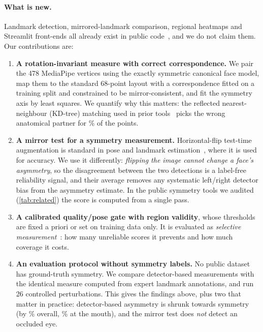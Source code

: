 \paragraph{What is new.}
Landmark detection, mirrored-landmark comparison, regional heatmaps and Streamlit
front-ends all already exist in public code~\cite{nashokan_facialasymmetry,
varghaei2025aesthetic,irimid}, and we do not claim them. Our contributions are:
\begin{enumerate}[leftmargin=*,itemsep=1pt,topsep=2pt]
\item \textbf{A rotation-invariant measure with correct correspondence.} We pair the
478 MediaPipe vertices using the exactly symmetric canonical face model, map them to the
standard 68-point layout with a correspondence fitted on a training split and constrained
to be mirror-consistent, and fit the symmetry axis by least squares. We quantify why this
matters: the reflected nearest-neighbour (KD-tree) matching used in prior
tools~\cite{nashokan_facialasymmetry,varghaei2025aesthetic} picks the wrong anatomical
partner for \kdWrong\% of the points.
\item \textbf{A mirror test for a symmetry measurement.} Horizontal-flip test-time
augmentation is standard in pose and landmark
estimation~\cite{newell2016stacked,wang2020hrnet}, where it is used for accuracy. We use it
differently: \emph{flipping the image cannot change a face's asymmetry}, so the
disagreement between the two detections is a label-free reliability signal, and their
average removes any systematic left/right detector bias from the asymmetry estimate. In
the public symmetry tools we audited (\cref{tab:related}) the score is computed from a
single pass.
\item \textbf{A calibrated quality/pose gate with region validity}, whose thresholds
are fixed a priori or set on training data only. It is evaluated as \emph{selective
measurement}~\cite{geifman2017selective}: how many unreliable scores it prevents and how
much coverage it costs.
\item \textbf{An evaluation protocol without symmetry labels.} No public dataset has
ground-truth symmetry. We compare detector-based measurements with the identical measure
computed from expert landmark annotations, and run 26 controlled perturbations. This
gives the findings above, plus two that matter in practice: detector-based asymmetry is
shrunk towards symmetry (by \shrinkGlobal\% overall, \shrinkMouth\% at the mouth), and
the mirror test does \emph{not} detect an occluded eye.
\end{enumerate}
